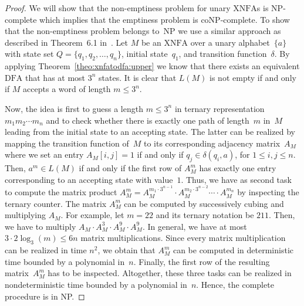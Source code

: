 \documentclass[final,copyright,noderivs]{eptcs}
\theoremstyle{plain}
\theoremstyle{definition}
\newcommand{\dfa}{\textrm{DFA}}
\newcommand{\xnfa}{\textrm{XNFA}}
\begin{document}
\begin{proof}
We will show that the non-emptiness problem for unary $\xnfa$s is {\sf NP}-complete
which implies that the emptiness problem is {\sf coNP}-complete.
To show that the non-emptiness problem belongs to~{\sf NP} we use a similar approach
as described in Theorem~6.1 in~\cite{Stockmeyer:1973:WPR}. Let $M$ be an $\xnfa$ over
a unary alphabet~$\{a\}$
with state set $Q=\{q_1, q_2, \ldots, q_n\}$, initial state~$q_1$, and transition function~$\delta$. 
By applying Theorem~\ref{theo:xnfatodfa:upper} we know that there exists an
equivalent $\dfa$ that has at most $3^n$ states.
It is clear that $L(M)$ is not empty if and only if $M$ accepts a word of length $m \le 3^n$.

Now, the idea is first to guess a length $m \le 3^n$
in ternary representation $m_1m_2 \cdots m_n$ and to check whether there is 
exactly one
path of length~$m$ in~$M$ leading from the initial state to an accepting state.
The latter can be realized by mapping the transition function of~$M$ to its corresponding 
adjacency matrix~$A_M$ where we set an entry $A_M[i,j]=1$ if and only if
$q_j\in \delta(q_i,a)$, 
for $1 \le i,j \le n$. Then, $a^m \in L(M)$ if and only if the first row of $A_M^m$ has 
exactly one entry corresponding to an accepting state with value~$1$. 
Thus, we have as second task to compute the matrix product 
\mbox{$A_M^m=A_M^{m_1 \cdot 3^{n-1}} \cdot A_M^{m_2 \cdot 3^{n-2}}\cdots \cdot A_M^{m_n}$}
by inspecting the ternary counter. The matrix $A_M^m$ can be computed
by successively cubing and multiplying $A_M$. For example, let $m=22$ and its ternary notation be $211$.
Then, we have to multiply $A_M \cdot A_M^3 \cdot A_M^9 \cdot A_M^9$. In general, we
have at most \mbox{$3 \cdot 2 \log_3 (m) \le 6n$}
matrix multiplications. Since every matrix multiplication can be 
realized in time $n^2$, we obtain that $A_M^m$ can be computed in deterministic time bounded by a polynomial in~$n$.
Finally, the first row of the resulting matrix~$A_M^m$ has to be inspected. 
Altogether, these three tasks can be realized in nondeterministic time bounded by a polynomial in~$n$.
Hence, the complete procedure is in {\sf NP}.


\end{proof}
\end{document}
